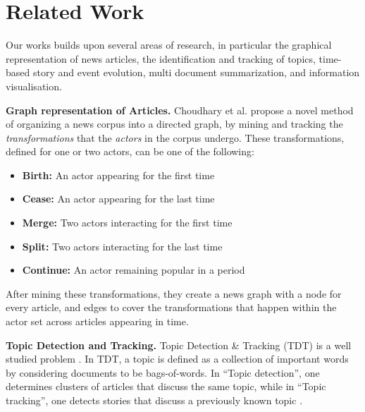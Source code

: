 \section{Related Work}
\label{sec:related}

Our works builds upon several areas of research, in particular the graphical representation of news articles, the identification and tracking of topics, time-based story and event evolution, multi document summarization, and information visualisation.

\textbf{Graph representation of Articles.} Choudhary et al.\cite{choudhary@ecir2008} propose a novel method of organizing a news corpus into a directed graph, by mining and tracking the \emph{transformations} that the \emph{actors} in the corpus undergo. These transformations, defined for one or two actors, can be one of the following:
\begin{itemize}
  \item \textbf{Birth:} An actor appearing for the first time
  \item \textbf{Cease:} An actor appearing for the last time
  \item \textbf{Merge:} Two actors interacting for the first time
  \item \textbf{Split:} Two actors interacting for the last time
  \item \textbf{Continue:} An actor remaining popular in a period
\end{itemize}
After mining these transformations, they create a news graph with a node for every article, and edges to cover the transformations that happen within the actor set across articles appearing in time. 

\textbf{Topic Detection and Tracking.} Topic Detection \& Tracking (TDT) is a well studied problem \cite{springerlink:10.1023/B:INRT.0000011210.12953.86, springerlink:10.1007, Franz:2001:USC:383952.384013}. In TDT, a topic is defined as a collection of important words by considering documents to be bags-of-words. In ``Topic detection'', one determines clusters of articles that discuss the same topic, while in ``Topic tracking'', one detects stories that discuss a previously known topic \cite{Allan:2002:TDT:772260}. 

